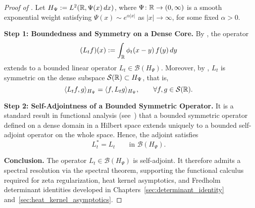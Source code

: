 \begin{proof}[Proof of ]
Let \( H_\Psi := L^2(\mathbb{R}, \Psi(x)\, dx) \), where \( \Psi \colon \mathbb{R} \to (0,\infty) \) is a smooth exponential weight satisfying \( \Psi(x) \sim e^{\alpha|x|} \) as \( |x| \to \infty \), for some fixed \( \alpha > 0 \).

\medskip
\noindent\textbf{Step 1: Boundedness and Symmetry on a Dense Core.}
By , the operator
\[
(L_t f)(x) := \int_{\mathbb{R}} \phi_t(x - y)\, f(y)\, dy
\]
extends to a bounded linear operator \( L_t \in \mathcal{B}(H_\Psi) \). Moreover, by , \( L_t \) is symmetric on the dense subspace \( \mathcal{S}(\mathbb{R}) \subset H_\Psi \), that is,
\[
\langle L_t f, g \rangle_{H_\Psi} = \langle f, L_t g \rangle_{H_\Psi}, \qquad \forall f, g \in \mathcal{S}(\mathbb{R}).
\]

\medskip
\noindent\textbf{Step 2: Self-Adjointness of a Bounded Symmetric Operator.}
It is a standard result in functional analysis (see~\cite[Theorem~VI.1]{ReedSimon1980I}) that a bounded symmetric operator defined on a dense domain in a Hilbert space extends uniquely to a bounded self-adjoint operator on the whole space. Hence, the adjoint satisfies
\[
L_t^* = L_t \qquad \text{in } \mathcal{B}(H_\Psi).
\]

\medskip
\noindent\textbf{Conclusion.}
The operator \( L_t \in \mathcal{B}(H_\Psi) \) is self-adjoint. It therefore admits a spectral resolution via the spectral theorem, supporting the functional calculus required for zeta regularization, heat kernel asymptotics, and Fredholm determinant identities developed in Chapters~\ref{sec:determinant_identity} and~\ref{sec:heat_kernel_asymptotics}.
\end{proof}
